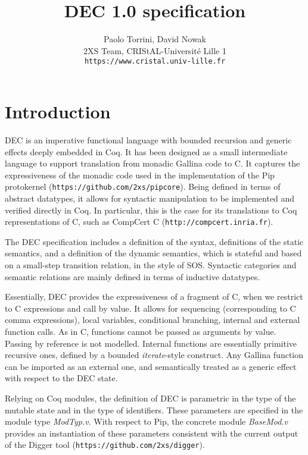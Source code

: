 \documentclass{article}
\begin{document}
\title{DEC 1.0 specification}

\author{Paolo Torrini, David Nowak \\
  \small 2XS Team, CRIStAL-Universit{\'e} Lille 1 \\
   \texttt{https://www.cristal.univ-lille.fr} }

\date{\vspace{-2ex}}

\maketitle  

\section{Introduction}

DEC is an imperative functional language with bounded recursion and
generic effects deeply embedded in Coq. It has been designed as a
small intermediate language to support translation from monadic
Gallina code to C. It captures the expressiveness of the monadic code
used in the implementation of the Pip protokernel
(\texttt{https://github.com/2xs/pipcore}). Being defined in terms of
abstract datatypes, it allows for syntactic manipulation to be
implemented and verified directly in Coq. In particular, this is the
case for its translations to Coq representations of C, such as
CompCert C (\texttt{http://compcert.inria.fr}).

The DEC specification includes a definition of the syntax, definitions
of the static semantics, and a definition of the dynamic semantics,
which is stateful and based on a small-step transition relation, in
the style of SOS. Syntactic categories and semantic relations are
mainly defined in terms of inductive datatypes.

Essentially, DEC provides the expressiveness of a fragment of C, when
we restrict to C expressions and call by value. It allows for
sequencing (corresponding to C comma expressions), local variables,
conditional branching, internal and external function calls. As in C,
functions cannot be passed as arguments by value. Passing by reference
is not modelled. Internal functions are essentially primitive
recursive ones, defined by a bounded \emph{iterate}-style
construct. Any Gallina function can be imported as an external one,
and semantically treated as a generic effect with respect to the DEC
state.

Relying on Coq modules, the definition of DEC is parametric in the
type of the mutable state and in the type of identifiers. These
parameters are specified in the module type \emph{ModTyp.v}. With
respect to Pip, the concrete module \emph{BaseMod.v} provides an
instantiation of these parameters consistent with the current output
of the Digger tool (\texttt{https://github.com/2xs/digger}).
\end{document}
